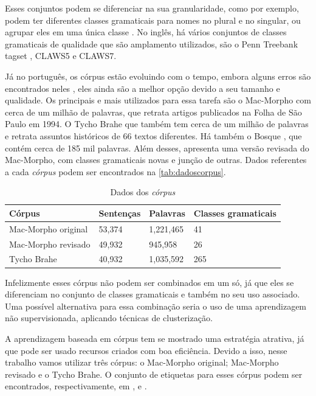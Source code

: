 Esses conjuntos podem se diferenciar na sua granularidade, como por exemplo, podem ter diferentes classes gramaticais para nomes no plural e no singular, ou agrupar eles em uma única classe \cite{fonseca2015evaluating}. No inglês, há vários conjuntos de classes gramaticais de qualidade que são amplamento utilizados, são o Penn Treebank tagset \cite{penntreebank}, CLAWS5 e CLAWS7.

Já no português, os córpus estão evoluindo com o tempo, embora alguns erros são encontrados neles \cite{fonseca2013mac}, eles ainda são a melhor opção devido a seu tamanho e qualidade. Os principais e mais utilizados para essa tarefa são o Mac-Morpho \cite{aluisio2003account} com cerca de um milhão de palavras, que retrata artigos publicados na Folha de São Paulo em 1994. O Tycho Brahe \cite{temponi2004corpus} que também tem cerca de um milhão de palavras e retrata assuntos históricos de 66 textos diferentes. Há também o Bosque \cite{afonso2002floresta}, que contém cerca de 185 mil palavras. Além desses, \cite{fonseca2015evaluating} apresenta uma versão revisada do Mac-Morpho, com classes gramaticais novas e junção de outras. Dados referentes a cada \textit{córpus} podem ser encontrados na \autoref{tab:dadoscorpus}.

\begin{table}[!htb]
\footnotesize
\centering
\caption{Dados dos \textit{córpus}}
\label{tab:dadoscorpus}
\begin{tabular}{m{4cm}m{2cm}m{2cm}m{4cm}}
  \toprule
  \textbf{Córpus} & \textbf{Sentenças}  & \textbf{Palavras}  & \textbf{Classes gramaticais}  \\
  \midrule
  Mac-Morpho original & 53,374 & 1,221,465 & 41  \\
  Mac-Morpho revisado & 49,932 & 945,958   & 26  \\
  Tycho Brahe         & 40,932 & 1,035,592 & 265 \\
  \bottomrule
\end{tabular}
\end{table}

Infelizmente esses córpus não podem ser combinados em um só, já que eles se diferenciam no conjunto de classes gramaticais e também no seu uso associado. Uma possível alternativa para essa combinação seria o uso de uma aprendizagem não supervisionada, aplicando técnicas de clusterização.

A aprendizagem baseada em córpus tem se mostrado uma estratégia atrativa, já que pode ser usado recursos criados com boa eficiência. Devido a isso, nesse trabalho vamos utilizar três córpus: o Mac-Morpho original; Mac-Morpho revisado e o Tycho Brahe. O conjunto de etiquetas para esses córpus podem ser encontrados, respectivamente, em \cite{aluisio2003account}, \cite{fonseca2015evaluating} e \cite{temponi2004corpus}.



